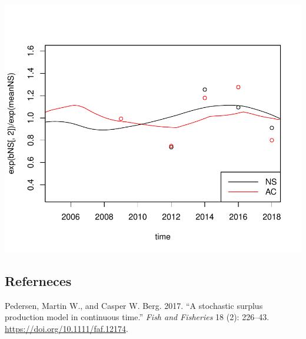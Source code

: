 \documentclass[
]{article}
\begin{document}
\includegraphics{aru.27.123a4_SPiCT_WD_files/figure-latex/unnamed-chunk-1-1.pdf}

\hypertarget{referneces}{%
\subsection*{Referneces}\label{referneces}}

\hypertarget{refs}{}
\leavevmode\hypertarget{ref-Pedersen2016}{}%
Pedersen, Martin W., and Casper W. Berg. 2017. ``A stochastic surplus
production model in continuous time.'' \emph{Fish and Fisheries} 18 (2):
226--43. \url{https://doi.org/10.1111/faf.12174}.
\end{document}
